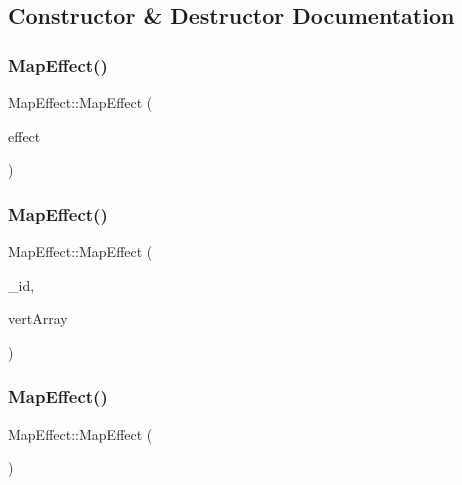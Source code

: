 \subsection{Constructor \& Destructor Documentation}
\mbox{\label{class_map_effect_aff543fedf91ca1798942f756c8388aa3}} 
\subsubsection{\texorpdfstring{Map\+Effect()}{MapEffect()}\hspace{0.1cm}{\footnotesize\ttfamily [1/3]}}
{\footnotesize\ttfamily Map\+Effect\+::\+Map\+Effect (\begin{DoxyParamCaption}\item[{const \mbox{\hyperlink{class_map_effect}{Map\+Effect}} \&}]{effect }\end{DoxyParamCaption})}

\mbox{\label{class_map_effect_ac517bf5e557ac443b45a1dedb2b216ab}} 
\subsubsection{\texorpdfstring{Map\+Effect()}{MapEffect()}\hspace{0.1cm}{\footnotesize\ttfamily [2/3]}}
{\footnotesize\ttfamily Map\+Effect\+::\+Map\+Effect (\begin{DoxyParamCaption}\item[{int}]{\+\_\+id,  }\item[{sf\+::\+Vertex\+Array}]{vert\+Array }\end{DoxyParamCaption})}

\mbox{\label{class_map_effect_aa271c0e92d24c599620890409a7a0de6}} 
\subsubsection{\texorpdfstring{Map\+Effect()}{MapEffect()}\hspace{0.1cm}{\footnotesize\ttfamily [3/3]}}
{\footnotesize\ttfamily Map\+Effect\+::\+Map\+Effect (\begin{DoxyParamCaption}{ }\end{DoxyParamCaption})}



